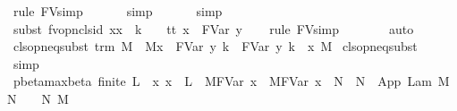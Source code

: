 \begin{isabellebody}
\ {\isacharparenleft}rule\ FV{\isacharunderscore}simp{}{\isacharparenright}\isanewline
\ \ \isamarkupfalse%
\ {}\ \isamarkupfalse%
\ simp\isanewline
\ \ \isamarkupfalse%
\ {}\ \isamarkupfalse%
\ simp\isanewline
\ \ \isamarkupfalse%
\ {\isacharparenleft}subst\ fv{\isacharunderscore}opn{\isacharunderscore}cls{\isacharunderscore}id{}{\isacharbrackleft}\ x{\isacharequal}x{\isacharprime}\ \ k\ {\isacharequal}\ {}\ \ t{\isacharequal}{\isachardoublequoteopen}t\ {\isacharbrackleft}x\ {\isacharcolon}{\isacharcolon}{\isacharequal}\ FVar\ y{\isacharbrackright}{\isachardoublequoteclose}{\isacharbrackright}{\isacharparenright}\isanewline
\ \ \isamarkupfalse%
\ {\isacharparenleft}rule\ FV{\isacharunderscore}simp{}{\isacharparenright}\isanewline
\ \ \isamarkupfalse%
\ {}\ {}\ \isamarkupfalse%
\ auto\isanewline
{}\isamarkupfalse%
%
\endisatagproof
{\isafoldproof}%
%
\isadelimproof
\isanewline
%
\endisadelimproof
\isanewline
{}\isamarkupfalse%
\ cls{\isacharunderscore}opn{\isacharunderscore}eq{\isacharunderscore}subst{}{\isacharcolon}\ {\isachardoublequoteopen}trm\ M\ {\isasymLongrightarrow}\ {\isacharparenleft}M{\isacharbrackleft}x\ {\isacharcolon}{\isacharcolon}{\isacharequal}\ FVar\ y{\isacharbrackright}{\isacharparenright}\ {\isacharequal}{\isacharparenleft}{\isacharbraceleft}k\ {\isasymrightarrow}\ FVar\ y{\isacharbraceright}\ {\isacharbraceleft}k\ {\isacharless}{\isacharminus}\ x{\isacharbraceright}\ M{\isacharparenright}{\isachardoublequoteclose}\isanewline
%
\isadelimproof
%
\endisadelimproof
%
\isatagproof
{}\isamarkupfalse%
\ cls{\isacharunderscore}opn{\isacharunderscore}eq{\isacharunderscore}subst\ \isamarkupfalse%
\ simp%
\endisatagproof
{\isafoldproof}%
%
\isadelimproof
%
\endisadelimproof
%
\isamarkuptrue%
\isamarkupfalse%
\ pbeta{\isacharunderscore}max{\isacharunderscore}beta{\isacharprime}{\isacharcolon}\ {\isachardoublequoteopen}finite\ L\ {\isasymLongrightarrow}\ {\isacharparenleft}{\isasymAnd}x{\isachardot}\ x\ {\isasymnotin}\ L\ {\isasymLongrightarrow}\ M{\isacharcircum}{\isacharparenleft}FVar\ x{\isacharparenright}\ {\isachargreater}{\isachargreater}{\isachargreater}\ M{\isacharprime}{\isacharcircum}{\isacharparenleft}FVar\ x{\isacharparenright}{\isacharparenright}\ {\isasymLongrightarrow}\ N\ {\isachargreater}{\isachargreater}{\isachargreater}\ N{\isacharprime}\ {\isasymLongrightarrow}\ App\ {\isacharparenleft}Lam\ M{\isacharparenright}\ N\ {\isachargreater}{\isachargreater}{\isachargreater}\ {\isacharbraceleft}{}\ {\isasymrightarrow}\ N{\isacharprime}{\isacharbraceright}\ M{\isacharprime}{\isachardoublequoteclose}%

\end{isabellebody}
